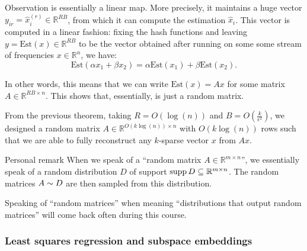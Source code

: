 \documentclass[a4paper]{article}
\begin{document}
\begin{parag}{Observation}
     is essentially a linear map. More precisely, it maintains a huge vector $y_{i r} = \hat{x}_i^{\left(r\right)} \in \mathbb{R}^{RB}$, from which it can compute the estimation $\hat{x}_i$. This vector is computed in a linear fashion: fixing the hash functions and leaving $y = \text{Est}\left(x\right) \in \mathbb{R}^{RB}$ to be the vector obtained after running  on some some stream of frequencies $x \in \mathbb{R}^n$, we have: 
    \[\text{Est}\left(\alpha x_1 + \beta x_2\right) = \alpha \text{Est}\left(x_1\right) + \beta \text{Est}\left(x_2\right).\]

    In other words, this means that we can write $\text{Est}\left(x\right) = A x$ for some matrix $A \in \mathbb{R}^{RB \times n}$. This shows that, essentially,  is just a random matrix.

    From the previous theorem, taking $R = O\left(\log\left(n\right)\right)$ and $B = O\left(\frac{k}{\epsilon^2}\right)$, we designed a random matrix $A \in \mathbb{R}^{O\left(k\log\left(n\right)\right) \times n}$ with $O\left(k \log\left(n\right)\right)$ rows such that we are able to fully reconstruct any $k$-sparse vector $x$ from $Ax$.

    \begin{subparag}{Personal remark}
        When we speak of a ``random matrix $A \in \mathbb{R}^{m \times n}$'', we essentially speak of a random distribution $D$ of support $\operatorname{supp} D \subseteq \mathbb{R}^{m \times n}$. The random matrices $A \sim D$ are then sampled from this distribution.

        Speaking of ``random matrices'' when meaning ``distributions that output random matrices'' will come back often during this course.
    \end{subparag}
\end{parag}

\subsubsection{Least squares regression and subspace embeddings}
\end{document}
